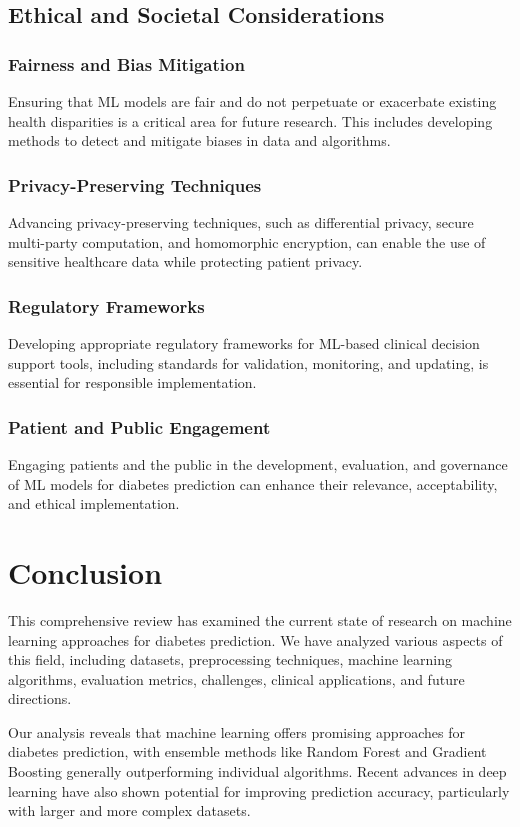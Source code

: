 \documentclass[journal]{IEEEtran}
\begin{document}
\subsection{Ethical and Societal Considerations}
\subsubsection{Fairness and Bias Mitigation}
Ensuring that ML models are fair and do not perpetuate or exacerbate existing health disparities is a critical area for future research. This includes developing methods to detect and mitigate biases in data and algorithms.

\subsubsection{Privacy-Preserving Techniques}
Advancing privacy-preserving techniques, such as differential privacy, secure multi-party computation, and homomorphic encryption, can enable the use of sensitive healthcare data while protecting patient privacy.

\subsubsection{Regulatory Frameworks}
Developing appropriate regulatory frameworks for ML-based clinical decision support tools, including standards for validation, monitoring, and updating, is essential for responsible implementation.

\subsubsection{Patient and Public Engagement}
Engaging patients and the public in the development, evaluation, and governance of ML models for diabetes prediction can enhance their relevance, acceptability, and ethical implementation.

\section{Conclusion}
This comprehensive review has examined the current state of research on machine learning approaches for diabetes prediction. We have analyzed various aspects of this field, including datasets, preprocessing techniques, machine learning algorithms, evaluation metrics, challenges, clinical applications, and future directions.

Our analysis reveals that machine learning offers promising approaches for diabetes prediction, with ensemble methods like Random Forest and Gradient Boosting generally outperforming individual algorithms. Recent advances in deep learning have also shown potential for improving prediction accuracy, particularly with larger and more complex datasets.
\end{document}
